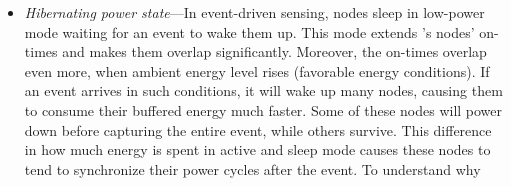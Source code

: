 \begin{itemize}
\begin{figure}
{		}
		\label{fig:noRand}
\end{figure} 
%
		\item \label{it:hibernating} \textit{Hibernating power state}---In event-driven sensing, nodes sleep in low-power mode waiting for an event to wake them up. This mode extends \cis's nodes' on-times and makes them overlap significantly. Moreover, the on-times overlap even more, when ambient energy level rises (favorable energy conditions). If an event arrives in such conditions, it will wake up many nodes, causing them to consume their buffered energy much faster. Some of these nodes will power down before capturing the entire event, while others survive. This difference in how much energy is spent in active and sleep mode causes these nodes to tend to synchronize their power cycles after the event. To understand why

\end{itemize}
